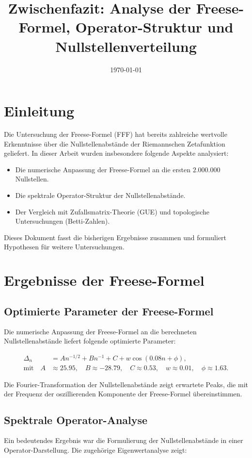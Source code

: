\documentclass[a4paper,12pt]{article}
\title{Zwischenfazit: Analyse der Freese-Formel, Operator-Struktur und Nullstellenverteilung}
\author{}
\date{\today}
\begin{document}
\maketitle

\section{Einleitung}
Die Untersuchung der Freese-Formel (FFF) hat bereits zahlreiche wertvolle Erkenntnisse über die Nullstellenabstände der Riemannschen Zetafunktion geliefert. In dieser Arbeit wurden insbesondere folgende Aspekte analysiert:

\begin{itemize}
    \item Die numerische Anpassung der Freese-Formel an die ersten $2.000.000$ Nullstellen.
    \item Die spektrale Operator-Struktur der Nullstellenabstände.
    \item Der Vergleich mit Zufallsmatrix-Theorie (GUE) und topologische Untersuchungen (Betti-Zahlen).
\end{itemize}

Dieses Dokument fasst die bisherigen Ergebnisse zusammen und formuliert Hypothesen für weitere Untersuchungen.

\section{Ergebnisse der Freese-Formel}
\subsection{Optimierte Parameter der Freese-Formel}
Die numerische Anpassung der Freese-Formel an die berechneten Nullstellenabstände liefert folgende optimierte Parameter:

\begin{align}
    \Delta_n &= A n^{-1/2} + B n^{-1} + C + w \cos(0.08 n + \phi), \\
    \text{mit} \quad A &\approx 25.95, \quad B \approx -28.79, \quad C \approx 0.53, \quad w \approx 0.01, \quad \phi \approx 1.63.
\end{align}

Die Fourier-Transformation der Nullstellenabstände zeigt erwartete Peaks, die mit der Frequenz der oszillierenden Komponente der Freese-Formel übereinstimmen.

\subsection{Spektrale Operator-Analyse}
Ein bedeutendes Ergebnis war die Formulierung der Nullstellenabstände in einer Operator-Darstellung. Die zugehörige Eigenwertanalyse zeigt:
\end{document}
